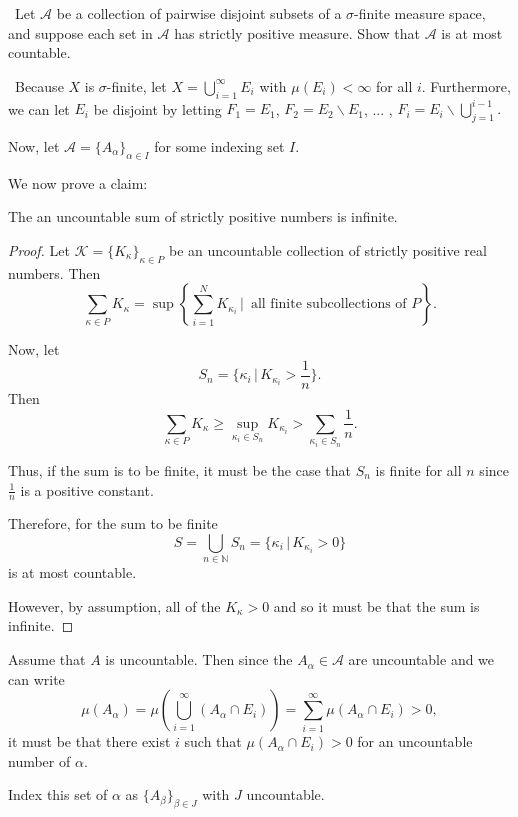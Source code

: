\documentclass[12pt]{Homework}
\begin{document}
\begin{problem} $\,$
Let $\mathscr{A}$ be a collection of pairwise disjoint subsets of a $\sigma$-finite measure space, and suppose each set in $\mathscr{A}$ has strictly positive measure. Show that $\mathscr{A}$ is at most countable.
\end{problem}


\begin{solution}$\,$
Because $X$ is $\sigma$-finite, let $X=\bigcup_{i=1}^\infty E_i$ with $\mu(E_i)<\infty$ for all $i.$ Furthermore, we can let $E_i$ be disjoint by letting $F_1=E_1$, $F_2=E_2\backslash E_1$, ... , $F_i=E_i\backslash \bigcup_{j=1}^{i-1}.$ %

Now, let $\mathscr{A}=\{A_\alpha\}_{\alpha\in I}$ for some indexing set $I$.

We now prove a claim:
\begin{claim} The an uncountable sum of strictly positive numbers is infinite.
\begin{proof} Let $\mathscr{K}=\{K_\kappa\}_{\kappa\in P}$ be an uncountable collection of strictly positive real numbers. Then $$\sum_{\kappa\in P}K_\kappa=\sup\left\{\sum_{i=1}^NK_{\kappa_i}\,|\,\text{ all finite subcollections of }P\right\}.$$

Now, let $$S_n=\{\kappa_i\,|\,K_{\kappa_i}>\frac{1}{n}\}.$$ Then $$\sum_{\kappa\in P}K_\kappa\ge\sup_{\kappa_i\in S_n}K_{\kappa_i}>\sum_{\kappa_i\in S_n}\frac{1}{n}.$$

Thus, if the sum is to be finite, it must be the case that $S_n$ is finite for all $n$ since $\frac{1}{n}$ is a positive constant.

Therefore, for the sum to be finite $$S=\bigcup_{n\in\mathbb{N}}S_n=\{\kappa_i\,|\,K_{\kappa_i}>0\}$$ is at most countable.

However, by assumption, all of the $K_\kappa>0$ and so it must be that the sum is infinite.
\end{proof}
\end{claim}

Assume that $A$ is uncountable. Then since the $A_\alpha\in\mathscr{A}$ are uncountable and we can write $$\mu(A_\alpha)=\mu(\bigcup_{i=1}^\infty(A_\alpha\cap E_i))=\sum_{i=1}^\infty\mu(A_\alpha\cap E_i)>0,$$ it must be that there exist $i$ such that $\mu(A_\alpha\cap E_i)>0$ for an uncountable number of $\alpha$.

Index this set of $\alpha$ as $\{A_\beta\}_{\beta\in J}$ with $J$ uncountable.


\end{solution}
\end{document}

